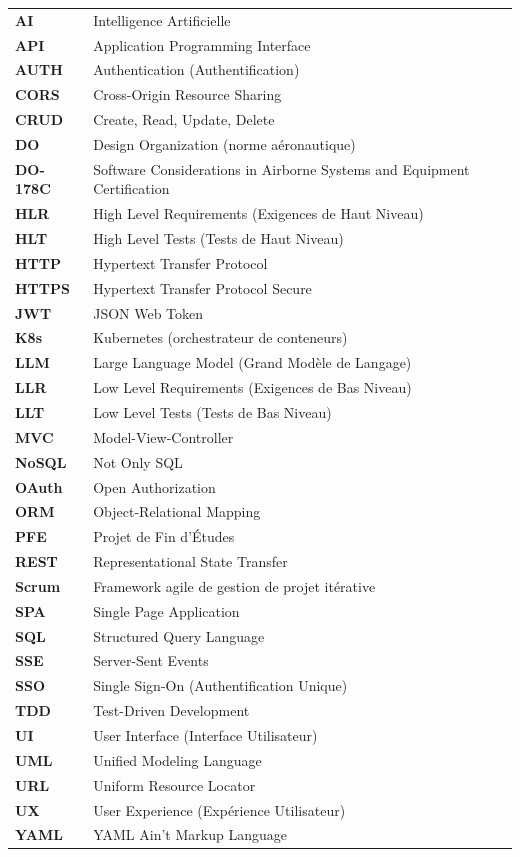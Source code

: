 \begin{longtable}{lp{}}
  \textbf{AI}     & Intelligence Artificielle \\
  \textbf{API}    & Application Programming Interface \\
  \textbf{AUTH}   & Authentication (Authentification) \\
  \textbf{CORS}   & Cross-Origin Resource Sharing \\
  \textbf{CRUD}   & Create, Read, Update, Delete \\
  \textbf{DO}     & Design Organization (norme aéronautique) \\
  \textbf{DO-178C}& Software Considerations in Airborne Systems and Equipment Certification \\
  \textbf{HLR}    & High Level Requirements (Exigences de Haut Niveau) \\
  \textbf{HLT}    & High Level Tests (Tests de Haut Niveau) \\
  \textbf{HTTP}   & Hypertext Transfer Protocol \\
  \textbf{HTTPS}  & Hypertext Transfer Protocol Secure \\
  \textbf{JWT}    & JSON Web Token \\
  \textbf{K8s}    & Kubernetes (orchestrateur de conteneurs) \\
  \textbf{LLM}    & Large Language Model (Grand Modèle de Langage) \\
  \textbf{LLR}    & Low Level Requirements (Exigences de Bas Niveau) \\
  \textbf{LLT}    & Low Level Tests (Tests de Bas Niveau) \\
  \textbf{MVC}    & Model-View-Controller \\
  \textbf{NoSQL}  & Not Only SQL \\
  \textbf{OAuth}  & Open Authorization \\
  \textbf{ORM}    & Object-Relational Mapping \\
  \textbf{PFE}    & Projet de Fin d'Études \\
  \textbf{REST}   & Representational State Transfer \\
  \textbf{Scrum}  & Framework agile de gestion de projet itérative \\
  \textbf{SPA}    & Single Page Application \\
  \textbf{SQL}    & Structured Query Language \\
  \textbf{SSE}    & Server-Sent Events \\
  \textbf{SSO}    & Single Sign-On (Authentification Unique) \\
  \textbf{TDD}    & Test-Driven Development \\
  \textbf{UI}     & User Interface (Interface Utilisateur) \\
  \textbf{UML}    & Unified Modeling Language \\
  \textbf{URL}    & Uniform Resource Locator \\
  \textbf{UX}     & User Experience (Expérience Utilisateur) \\
  \textbf{YAML}   & YAML Ain't Markup Language \\

  \bottomrule
\end{longtable}
